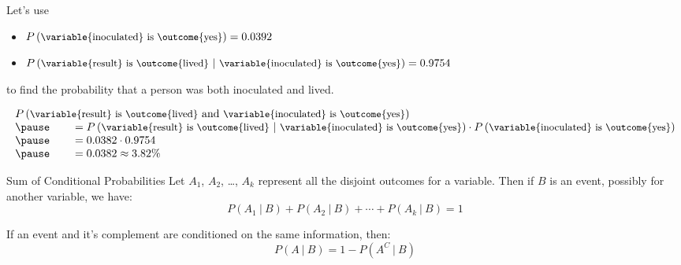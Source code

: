 \documentclass{beamer}
\newcommand{\prob}[1]{P\left({#1}\right)}
\newcommand{\jointprob}[3]{\prob{{#1}~\text{#2}~{#3}}}
\newcommand{\condprob}[2]{\prob{{#1}~|~{#2}}}
\begin{document}
\begin{frame}
\begin{example}
Let's use
\begin{itemize}
\item $\prob{\text{\small\variable{inoculated} is \outcome{yes}}}=0.0392$
\item $\condprob{\text{\small\variable{result} is \outcome{lived}}}{\text{\small\variable{inoculated} is \outcome{yes}}}=0.9754$
\end{itemize}
to find the probability that a person was both inoculated and lived.\pause

\vspace{-5mm}
\begin{equation*}
\begin{array}{l}
\jointprob{\text{\small\variable{result} is \outcome{lived}}}{and}{\text{\small\variable{inoculated} is \outcome{yes}}} \\\pause
\qquad= \condprob{\text{\small\variable{result} is \outcome{lived}}}{\text{\small\variable{inoculated} is \outcome{yes}}} \cdot \prob{\text{\small\variable{inoculated} is \outcome{yes}}}\\\pause
\qquad= 0.0382 \cdot 0.9754\\\pause
\qquad= 0.0382 \approx 3.82\%
\end{array}
\end{equation*}
\end{example}
\end{frame}

\begin{frame}
\begin{block}{Sum of Conditional Probabilities}
Let $A_1$, $A_2$, \ldots, $A_k$ represent all the disjoint outcomes for a variable. Then if $B$ is an event, possibly for another variable, we have:
\begin{equation*}
\condprob{A_1}{B} + \condprob{A_2}{B} + \cdots + \condprob{A_k}{B}  = 1
\end{equation*}
\end{block}\pause

\begin{note}
If an event and it's complement are conditioned on the same information, then:
\begin{equation*}
\condprob{A}{B} = 1 - \condprob{A^C}{B}
\end{equation*}
\end{note}\pause

\begin{example}
\pause
{}
\end{example}
\end{frame}
\end{document}

